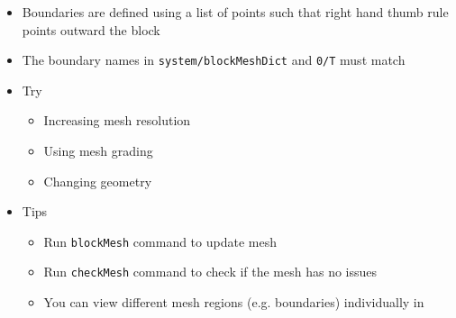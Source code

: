 \begin{frame}
    \begin{itemize}
        \setitemsep{1em}
        \item Boundaries are defined using a list of points such that right hand thumb rule points outward the block
        \item The boundary names in \texttt{system/blockMeshDict} and \texttt{0/T} must match
        \item Try
        \begin{itemize}
            \item Increasing mesh resolution
            \item Using mesh grading
            \item Changing geometry
        \end{itemize}
        \item Tips
        \begin{itemize}
            \item Run \texttt{blockMesh} command to update mesh
            \item Run \texttt{checkMesh} command to check if the mesh has no issues
            \item You can view different mesh regions (e.g. boundaries) individually in \paraview
        \end{itemize}
    \end{itemize}
\end{frame}

